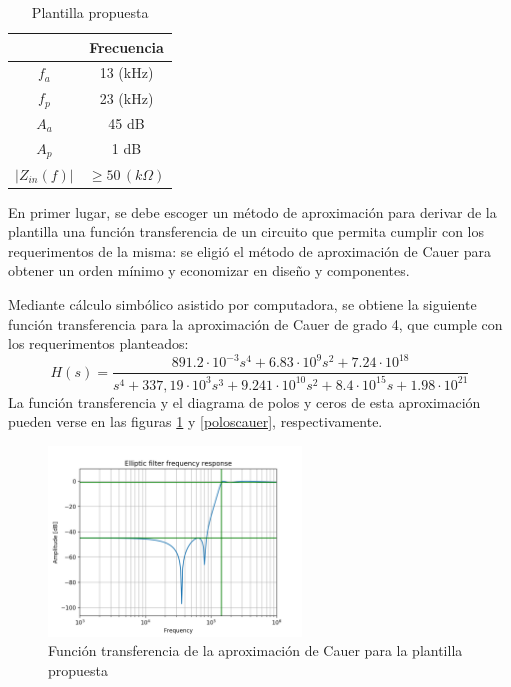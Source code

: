 \begin{table}[H]
\begin{centering}
\begin{tabular}{|c|c|}
\hline 
 & Frecuencia\tabularnewline
\hline 
\hline 
$f_{a}$ & 13 (kHz)\tabularnewline
\hline 
$f_{p}$ & 23 (kHz)\tabularnewline
\hline 
$A_{a}$ & 45 dB\tabularnewline
\hline 
$A_{p}$ & 1 dB\tabularnewline
\hline 
$\left|Z_{in}(f)\right|$ & $\geq50\,(k\Omega)$\tabularnewline
\hline 
\end{tabular}
\par\end{centering}
\caption{Plantilla propuesta}
\label{plantrestrictiva}
\end{table}

En primer lugar, se debe escoger un método de aproximación para derivar de la plantilla  una función transferencia de un circuito que permita cumplir con los requerimentos de la misma: se eligió el método de aproximación de Cauer para obtener un orden mínimo y economizar en diseño y componentes.

Mediante cálculo simbólico asistido por computadora, se obtiene la siguiente función transferencia para la aproximación de Cauer de grado 4, que cumple con los requerimentos planteados:
\[
H(s)=\frac{891.2\cdot10^{-3}s^{4}+6.83\cdot10^{9}s^{2}+7.24\cdot10^{18}}{s^{4}+337,19\cdot10^{3}s^{3}+9.241\cdot10^{10}s^{2}+8.4\cdot10^{15}s+1.98\cdot10^{21}}
\]
La función transferencia y el diagrama de polos y ceros de esta aproximación pueden verse en las figuras \ref{bodecauer} y \ref{poloscauer}, respectivamente. 

\begin{figure}[H]
\begin{centering}
\includegraphics[width=0.6\textwidth]{../Ex3/Resources/cauerbode.png}
\par\end{centering}
\caption{Función transferencia de la aproximación de Cauer para la plantilla propuesta}
\label{bodecauer}
\end{figure}

